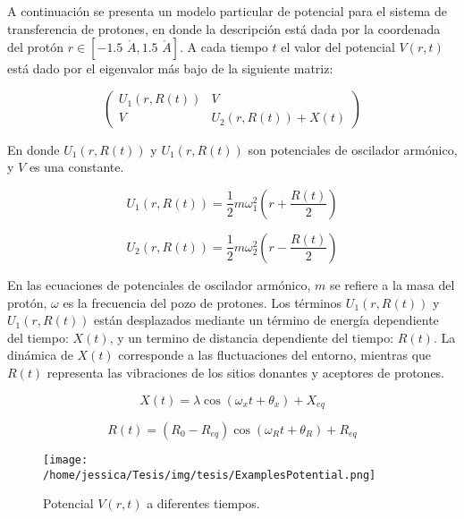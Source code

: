 A continuación se presenta un modelo particular de potencial para el sistema de transferencia de protones, en donde la descripción está dada por la coordenada del protón $r \in [-1.5 \,\,\mathring{A}, 1.5 \,\,\mathring{A}]$. A cada tiempo $t$ el valor del potencial $V(r,t)$ está dado por el eigenvalor más bajo de la siguiente matriz:

\begin{equation}
  \label{eq:matrixPot}
  \begin{pmatrix}
    U_1(r,R(t)) &   V \\
    V           & U_2(r,R(t))+X(t)
  \end{pmatrix}
\end{equation}

En donde $U_1(r,R(t))$ y  $U_1(r,R(t))$ son potenciales de oscilador armónico, y $V$ es una constante.

\begin{equation}
  \label{eq:U1}
  U_1(r,R(t))=\frac{1}{2}m\omega_1^2\left( r + \frac{R(t)}{2} \right)
\end{equation}

\begin{equation}
  \label{eq:U2}
  U_2(r,R(t))=\frac{1}{2}m\omega_2^2\left( r - \frac{R(t)}{2} \right)
\end{equation}

En las ecuaciones de potenciales de oscilador armónico, $m$ se refiere a la masa del protón, $\omega$ es la frecuencia del pozo de protones. Los términos $U_1(r,R(t))$ y  $U_1(r,R(t))$ están desplazados mediante un término de energía dependiente del tiempo: $X(t)$, y un termino de distancia dependiente del tiempo: $R(t)$. La dinámica de $X(t)$ corresponde a las fluctuaciones del entorno, mientras que $R(t)$ representa las vibraciones de los sitios donantes y aceptores de protones. \cite{Main:2021}

\begin{equation}
  \label{eq:X(t)}
  X(t)=\lambda \cos(\omega_xt+\theta_x)+X_{eq}
\end{equation}

\begin{equation}
  \label{eq:R(t)}
  R(t)=(R_0-R_{eq})\cos(\omega_Rt + \theta_R) + R_{eq}
\end{equation}

\begin{figure}[ht]
  \centering
  \texttt{[image: /home/jessica/Tesis/img/tesis/ExamplesPotential.png]}
  \caption{Potencial $V(r,t)$ a diferentes tiempos.}
  \label{fig:drawPot}
\end{figure}

